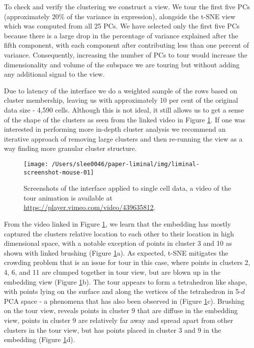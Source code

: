 \documentclass[article,notitle]{jdssv}
\begin{document}
To check and verify the clustering we construct a  view.
We tour the first five PCs (approximately 20\% of the variance in expression),
alongside the t-SNE view which was computed from all 25 PCs. We have selected only the first five PCs because there is a large drop in the percentage of variance explained after the fifth component, with each component after contributing less than one percent of variance.
Consequently, increasing the number of PCs to tour would increase the dimensionality and volume of the subspace we are touring but without adding any additional signal to the view.

Due to latency of the  interface we do a weighted sample of the rows based on
cluster membership, leaving us with approximately 10 per cent of the original
data size - 4,590 cells. Although this is not ideal, it still allows us to
get a sense of the shape of the clusters as seen from the linked video in Figure \ref{fig:mouse-01}. If one was interested in performing more in-depth cluster analysis we recommend an iterative approach of removing large clusters and then re-running the  view as a way finding more granular cluster structure.



\begin{figure}

{\centering \texttt{[image: /Users/slee0046/paper-liminal/img/liminal-screenshot-mouse-01]} 

}

\caption{Screenshots of the  interface applied to single cell data, a video of the tour animation is available at \url{https://player.vimeo.com/video/439635812}.}\label{fig:mouse-01}
\end{figure}

From the video linked in Figure \ref{fig:mouse-01}, we learn that the embedding has mostly captured the
clusters relative location to each other to their location in high dimensional space, with a notable exception of points in cluster 3 and 10 as shown with
linked brushing (Figure \ref{fig:mouse-01}a). As expected, t-SNE mitigates the crowding problem that is
an issue for tour in this case, where points in clusters 2, 4, 6, and 11 are
clumped together in tour view, but are blown up in the embedding view (Figure \ref{fig:mouse-01}b).
The tour appears to form a tetrahedron like shape, with points lying on
the surface and along the vertices of the tetrahedron in 5-\(d\) PCA space -
a phenomena that has also been observed in \citet{Korem2015-af}
(Figure \ref{fig:mouse-01}c). Brushing on
the tour view, reveals points in cluster 9 that are diffuse in the embedding
view, points in cluster 9 are relatively far away and spread apart from other
clusters in the tour view, but has points placed in cluster 3 and 9 in the embedding
(Figure \ref{fig:mouse-01}d).
\end{document}
